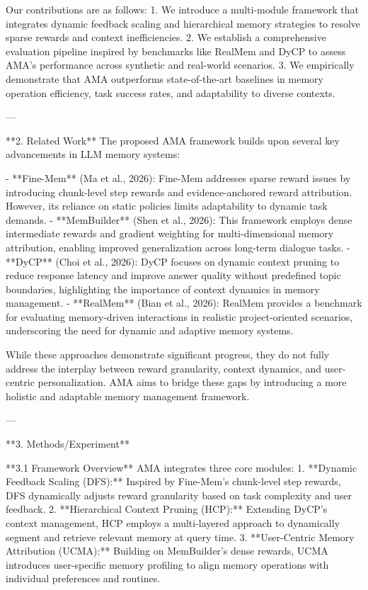 Our contributions are as follows:  
1. We introduce a multi-module framework that integrates dynamic feedback scaling and hierarchical memory strategies to resolve sparse rewards and context inefficiencies.  
2. We establish a comprehensive evaluation pipeline inspired by benchmarks like RealMem and DyCP to assess AMA's performance across synthetic and real-world scenarios.  
3. We empirically demonstrate that AMA outperforms state-of-the-art baselines in memory operation efficiency, task success rates, and adaptability to diverse contexts.  

---

**2. Related Work**  
The proposed AMA framework builds upon several key advancements in LLM memory systems:  

- **Fine-Mem** (Ma et al., 2026): Fine-Mem addresses sparse reward issues by introducing chunk-level step rewards and evidence-anchored reward attribution. However, its reliance on static policies limits adaptability to dynamic task demands.  
- **MemBuilder** (Shen et al., 2026): This framework employs dense intermediate rewards and gradient weighting for multi-dimensional memory attribution, enabling improved generalization across long-term dialogue tasks.  
- **DyCP** (Choi et al., 2026): DyCP focuses on dynamic context pruning to reduce response latency and improve answer quality without predefined topic boundaries, highlighting the importance of context dynamics in memory management.  
- **RealMem** (Bian et al., 2026): RealMem provides a benchmark for evaluating memory-driven interactions in realistic project-oriented scenarios, underscoring the need for dynamic and adaptive memory systems.  

While these approaches demonstrate significant progress, they do not fully address the interplay between reward granularity, context dynamics, and user-centric personalization. AMA aims to bridge these gaps by introducing a more holistic and adaptable memory management framework.  

---

**3. Methods/Experiment**  

**3.1 Framework Overview**  
AMA integrates three core modules:  
1. **Dynamic Feedback Scaling (DFS):** Inspired by Fine-Mem's chunk-level step rewards, DFS dynamically adjusts reward granularity based on task complexity and user feedback.  
2. **Hierarchical Context Pruning (HCP):** Extending DyCP's context management, HCP employs a multi-layered approach to dynamically segment and retrieve relevant memory at query time.  
3. **User-Centric Memory Attribution (UCMA):** Building on MemBuilder's dense rewards, UCMA introduces user-specific memory profiling to align memory operations with individual preferences and routines.  

